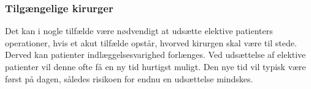 \subsubsection{Tilgængelige kirurger}
Det kan i nogle tilfælde være nødvendigt at udsætte elektive patienters operationer, hvis et akut tilfælde opstår, hvorved kirurgen skal være til stede. Derved kan patienter indlæggelsesvarighed forlænges. Ved udsættelse af elektive patienter vil denne ofte få en ny tid hurtigst muligt. Den nye tid vil typisk være først på dagen, således risikoen for endnu en udsættelse mindskes.